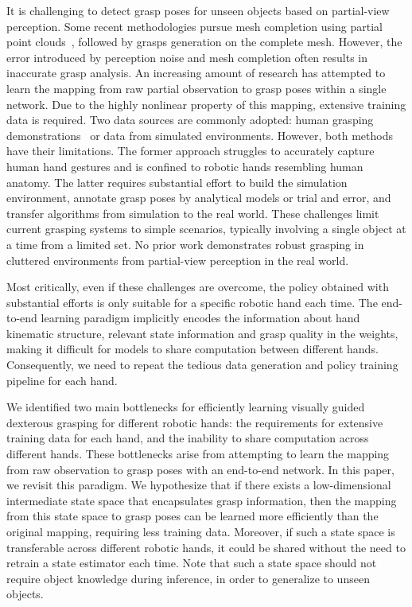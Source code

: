 It is challenging to detect grasp poses for unseen objects based on partial-view perception. Some recent methodologies pursue mesh completion using partial point clouds~\cite{lundell2021ddgc, wei2022dvgg, wei2024learning}, followed by grasps generation on the complete mesh. However, the error introduced by perception noise and mesh completion often results in inaccurate grasp analysis.  An increasing amount of research has attempted to learn the mapping from raw partial observation to grasp poses within a single network. Due to the highly nonlinear property of this mapping, extensive training data is required. Two data sources are commonly adopted: human grasping demonstrations~\cite{gupta2016learning, christen2019guided, qin2022dexmv, mandikal2022dexvip, wei2024learning, shaw2024learning} or data from simulated environments\cite{brahmbhatt2019contactgrasp, corona2020ganhand, grady2021contactopt,li2023gendexgrasp, wang2023dexgraspnet, lum2024dextrahg,
singh2025dextrahrgb}. However, both methods have their limitations. The former approach struggles to accurately capture human hand gestures and is confined to robotic hands resembling human anatomy. The latter requires substantial effort to build the simulation environment, annotate grasp poses by analytical models or trial and error, and transfer algorithms from simulation to the real world. These challenges limit current grasping systems to simple scenarios, typically involving a single object at a time from a limited set.  No prior work demonstrates robust grasping in cluttered environments from partial-view perception in the real world.

Most critically, even if these challenges are overcome, the policy obtained with substantial efforts is only suitable for a specific robotic hand each time. The  end-to-end learning paradigm implicitly encodes the information about hand kinematic structure, relevant state information and grasp quality in the weights, making it difficult for models to share computation between different hands. Consequently, we need to repeat the tedious data generation and policy training pipeline for each hand.

We identified two main bottlenecks for efficiently learning visually guided dexterous grasping for different robotic hands: the requirements for extensive training data for each hand, and the inability to share  computation across different hands. These bottlenecks arise from attempting to learn the mapping from raw observation to grasp poses with an end-to-end network. In this paper, we revisit this paradigm. We hypothesize that if there exists a low-dimensional intermediate state space that encapsulates grasp information, then the mapping from this state space to grasp poses can be learned more efficiently than the original mapping, requiring less training data. Moreover, if such a state space is transferable across different robotic hands, it could be shared without the need to retrain a state estimator each time. Note that such a state space should not require object knowledge during inference, in order to generalize to unseen objects.


